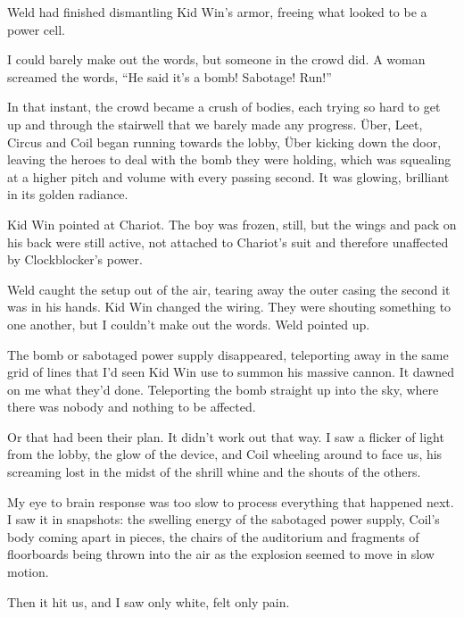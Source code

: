 Weld had finished dismantling Kid Win's armor, freeing what looked to be a power cell.



I could barely make out the words, but someone in the crowd did.  A woman screamed the words, ``He said it's a bomb!  Sabotage!  Run!''



In that instant, the crowd became a crush of bodies, each trying so hard to get up and through the stairwell that we barely made any progress.  \"{U}ber, Leet, Circus and Coil began running towards the lobby, \"{U}ber kicking down the door, leaving the heroes to deal with the bomb they were holding, which was squealing at a higher pitch and volume with every passing second.  It was glowing, brilliant in its golden radiance.



Kid Win pointed at Chariot.  The boy was frozen, still, but the wings and pack on his back were still active, not attached to Chariot's suit and therefore unaffected by Clockblocker's power.



Weld caught the setup out of the air, tearing away the outer casing the second it was in his hands.  Kid Win changed the wiring.  They were shouting something to one another, but I couldn't make out the words.  Weld pointed up.



The bomb or sabotaged power supply disappeared, teleporting away in the same grid of lines that I'd seen Kid Win use to summon his massive cannon.  It dawned on me what they'd done.  Teleporting the bomb straight up into the sky, where there was nobody and nothing to be affected.



Or that had been their plan.  It didn't work out that way.  I saw a flicker of light from the lobby, the glow of the device, and Coil wheeling around to face us, his screaming lost in the midst of the shrill whine and the shouts of the others.



My eye to brain response was too slow to process everything that happened next.  I saw it in snapshots: the swelling energy of the sabotaged power supply, Coil's body coming apart in pieces, the chairs of the auditorium and fragments of floorboards being thrown into the air as the explosion seemed to move in slow motion.



Then it hit us, and I saw only white, felt only pain.





